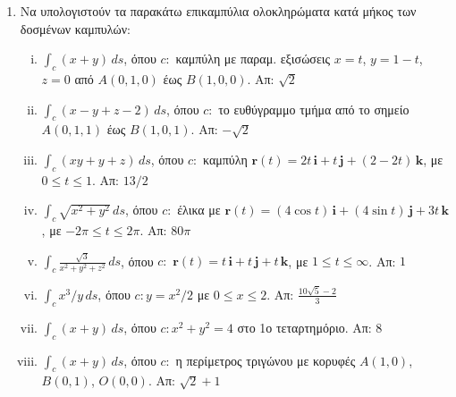 



\pagestyle{askhseis}
\everymath{\displaystyle}



\begin{center}
\minibox{\large\bfseries \textcolor{Col1}{Επικαμπύλιο Ολοκλήρωμα Ιου είδους}}
\end{center}

\vspace{\baselineskip}


\begin{enumerate}
  \item Να υπολογιστούν τα παρακάτω επικαμπύλια ολοκληρώματα κατά μήκος των 
    δοσμένων καμπυλών:
    \begin{enumerate}[i)]
      \item $ \int _{c} (x+y) \,{ds} $, όπου $ c \colon $ καμπύλη με 
        παραμ. εξισώσεις $ x=t $, $ y=1-t $, $ z=0 $ από $ A(0,1,0) $ έως $B(1,0,0)$. 
        \hfill Απ: $ \sqrt{2} $ 
      \item $ \int _{c} (x-y+z-2) \,{ds} $, όπου $ c \colon $ το ευθύγραμμο τμήμα 
        από το σημείο $ A(0,1,1) $ έως $ B(1,0,1) $.
        \hfill Απ: $ -\sqrt{2} $ 
      \item $ \int _{c} (xy+y+z) \,{ds} $, όπου $ c \colon $ καμπύλη 
        $ \mathbf{r}(t)=2t\, \mathbf{i} + t\, \mathbf{j} + (2-2t) \, \mathbf{k} $, 
        με $ 0 \leq t \leq 1 $.  
        \hfill Απ: $13/2$ 
      \item $ \int _{c} \sqrt{x^{2}+y^{2}} \,{ds} $, όπου $ c \colon $ έλικα με 
        $ \mathbf{r}(t)=(4 \cos{t} )\, \mathbf{i} + (4 \sin{t})\, \mathbf{j} + 3t \, 
        \mathbf{k} $, με $ -2 \pi \leq t \leq 2 \pi $.  
        \hfill Απ: $80 \pi$ 
      \item $ \int _{c} \frac{\sqrt{3}}{x^{2}+y^{2}+z^{2}}\,{ds} $, όπου $ c \colon $ 
        $ \mathbf{r}(t)= t\, \mathbf{i} + t\, \mathbf{j} + t\, 
        \mathbf{k} $, με $1 \leq t \leq \infty$.  
        \hfill Απ: $1$ 
      \item $ \int _{c} x^{3}/y \,{ds} $, όπου $ c \colon y=x^{2}/2 $ με 
        $0 \leq x \leq 2$.  
        \hfill Απ: $ \frac{10 \sqrt{5} -2}{3} $ 
      \item $ \int _{c} (x+y) \,{ds} $, όπου $ c \colon x^{2}+y^{2}=4 $ στο 1ο
        τεταρτημόριο.  \hfill Απ: $8$ 
      \item $ \int _{c} (x+y) \,{ds} $, όπου $ c \colon $ η περίμετρος τριγώνου 
        με κορυφές $ A(1,0) $, $ B(0,1) $, $ O(0,0) $.
        \hfill Απ: $ \sqrt{2} +1 $ 


\end{enumerate}
\end{enumerate}
